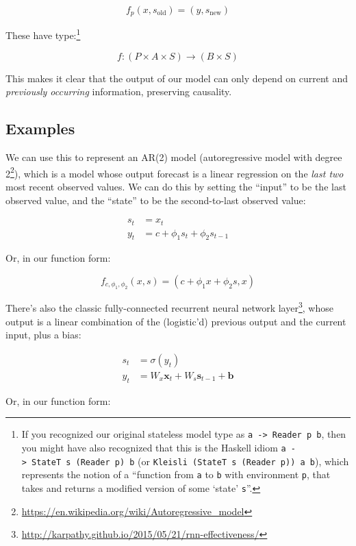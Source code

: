 \documentclass[]{article}
\renewcommand{\href}[2]{#2\footnote{\url{#1}}}
\begin{document}
\[
f_p(x, s_{\text{old}}) = (y, s_{\text{new}})
\]

These have type:\footnote{If you recognized our original stateless model type as
  \texttt{a\ -\textgreater{}\ Reader\ p\ b}, then you might have also recognized
  that this is the Haskell idiom
  \texttt{a\ -\textgreater{}\ StateT\ s\ (Reader\ p)\ b} (or
  \texttt{Kleisli\ (StateT\ s\ (Reader\ p))\ a\ b}), which represents the notion
  of a ``function from \texttt{a} to \texttt{b} with environment \texttt{p},
  that takes and returns a modified version of some `state' \texttt{s}''.}

\[
f : (P \times A \times S) \rightarrow (B \times S)
\]

This makes it clear that the output of our model can only depend on current and
\emph{previously occurring} information, preserving causality.

\subsection{Examples}\label{examples}

We can use this to represent an AR(2) model
(\href{https://en.wikipedia.org/wiki/Autoregressive_model}{autoregressive model
with degree 2}), which is a model whose output forecast is a linear regression
on the \emph{last two} most recent observed values. We can do this by setting
the ``input'' to be the last observed value, and the ``state'' to be the
second-to-last observed value:

\[
\begin{aligned}
s_t & = x_t \\
y_t & = c + \phi_1 s_t + \phi_2 s_{t - 1}
\end{aligned}
\]

Or, in our function form:

\[
f_{c, \phi_1, \phi_2}(x, s) = (c + \phi_1 x + \phi_2 s, x)
\]

There's also the classic
\href{http://karpathy.github.io/2015/05/21/rnn-effectiveness/}{fully-connected
recurrent neural network layer}, whose output is a linear combination of the
(logistic'd) previous output and the current input, plus a bias:

\[
\begin{aligned}
s_t & = \sigma(y_t) \\
y_t & = W_x \mathbf{x}_t + W_s \mathbf{s}_{t-1} + \mathbf{b}
\end{aligned}
\]

Or, in our function form:
\end{document}
